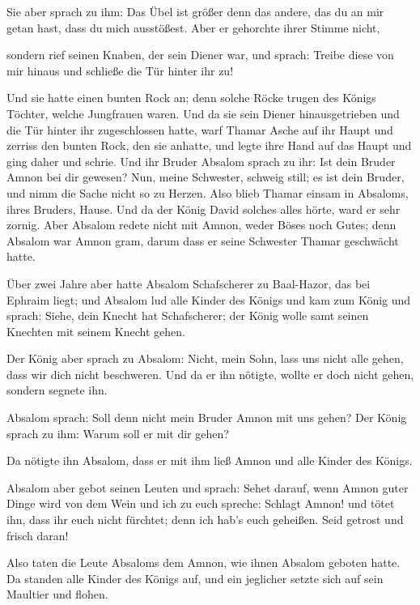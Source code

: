  Sie aber sprach zu ihm: Das Übel ist größer denn das
andere, das du an mir getan hast, dass du mich ausstößest. Aber er
gehorchte ihrer Stimme nicht,

 sondern rief seinen Knaben, der sein Diener war, und
sprach: Treibe diese von mir hinaus und schließe die Tür hinter ihr zu!

 Und sie hatte einen bunten Rock an; denn solche Röcke
trugen des Königs Töchter, welche Jungfrauen waren. Und da sie sein
Diener hinausgetrieben und die Tür hinter ihr zugeschlossen hatte,
 warf Thamar Asche auf ihr Haupt und zerriss den bunten
Rock, den sie anhatte, und legte ihre Hand auf das Haupt und ging daher
und schrie.  Und ihr Bruder Absalom sprach zu ihr: Ist
dein Bruder Amnon bei dir gewesen? Nun, meine Schwester, schweig still;
es ist dein Bruder, und nimm die Sache nicht so zu Herzen. Also blieb
Thamar einsam in Absaloms, ihres Bruders, Hause.  Und da
der König David solches alles hörte, ward er sehr zornig. Aber Absalom
redete nicht mit Amnon, weder Böses noch Gutes;  denn
Absalom war Amnon gram, darum dass er seine Schwester Thamar geschwächt
hatte.

 Über zwei Jahre aber hatte Absalom Schafscherer zu
Baal-Hazor, das bei Ephraim liegt; und Absalom lud alle Kinder des
Königs  und kam zum König und sprach: Siehe, dein Knecht
hat Schafscherer; der König wolle samt seinen Knechten mit seinem Knecht
gehen.

 Der König aber sprach zu Absalom: Nicht, mein Sohn, lass
uns nicht alle gehen, dass wir dich nicht beschweren. Und da er ihn
nötigte, wollte er doch nicht gehen, sondern segnete ihn.

 Absalom sprach: Soll denn nicht mein Bruder Amnon mit
uns gehen? Der König sprach zu ihm: Warum soll er mit dir gehen?

 Da nötigte ihn Absalom, dass er mit ihm ließ Amnon und
alle Kinder des Königs.

 Absalom aber gebot seinen Leuten und sprach: Sehet
darauf, wenn Amnon guter Dinge wird von dem Wein und ich zu euch
spreche: Schlagt Amnon! und tötet ihn, dass ihr euch nicht fürchtet;
denn ich hab's euch geheißen. Seid getrost und frisch daran!

 Also taten die Leute Absaloms dem Amnon, wie ihnen
Absalom geboten hatte. Da standen alle Kinder des Königs auf, und ein
jeglicher setzte sich auf sein Maultier und flohen.

